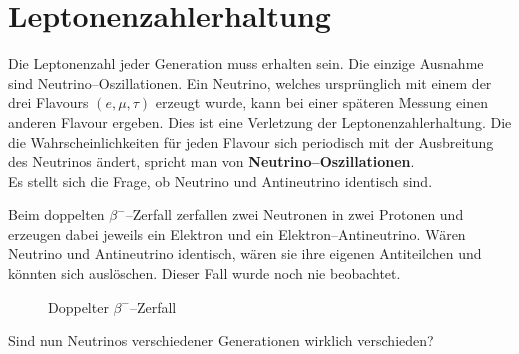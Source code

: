 \documentclass[Ex4_Zusammenfassung.tex]{subfiles}
\begin{document}
\section{Leptonenzahlerhaltung}
Die Leptonenzahl jeder Generation muss erhalten sein. Die einzige Ausnahme sind Neutrino--Oszillationen. Ein Neutrino, welches ursprünglich mit einem der drei Flavours $(e,\mu,\tau)$ erzeugt wurde, kann bei einer späteren Messung einen anderen Flavour ergeben. Dies ist eine Verletzung der Leptonenzahlerhaltung. Die die Wahrscheinlichkeiten für jeden Flavour sich periodisch mit der Ausbreitung des Neutrinos ändert, spricht man von \textbf{Neutrino--Oszillationen}.\\

Es stellt sich die Frage, ob Neutrino und Antineutrino identisch sind. 

Beim doppelten $\beta^-$--Zerfall zerfallen zwei Neutronen in zwei Protonen und erzeugen dabei jeweils ein Elektron und ein Elektron--Antineutrino. Wären Neutrino und Antineutrino identisch, wären sie ihre eigenen Antiteilchen und könnten sich auslöschen. Dieser Fall wurde noch nie beobachtet. 
\begin{figure}[h]
	\centering
	\caption{Doppelter $\beta^-$--Zerfall}
\end{figure}

Sind nun Neutrinos verschiedener Generationen wirklich verschieden?
\end{document}
